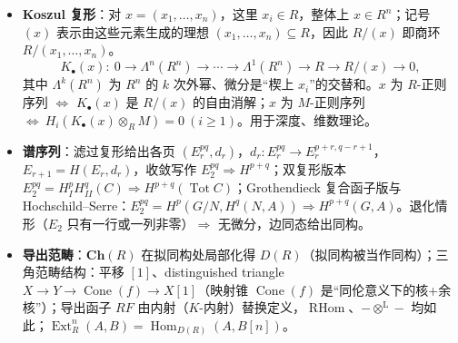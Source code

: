 \documentclass[12pt,a4paper]{ctexart}
\DeclareMathOperator{\Hom}{Hom}
\DeclareMathOperator{\Ext}{Ext}
\DeclareMathOperator{\Tot}{Tot}
\begin{document}
\begin{itemize}
  \item \textbf{Koszul 复形}：对 $x=(x_1,\dots,x_n)$，这里
  $x_i\in R$，整体上 $x\in R^n$；记号
  $(x)$ 表示由这些元素生成的理想
  $(x_1,\dots,x_n)\subseteq R$，因此 $R/(x)$ 即商环
  $R/(x_1,\dots,x_n)$。
  \[
    K_\bullet(x):\ 0\longrightarrow\Lambda^n(R^n)\longrightarrow\cdots\longrightarrow\Lambda^1(R^n)\longrightarrow R\longrightarrow R/(x)\longrightarrow0,
  \]
  其中 $\Lambda^k(R^n)$ 为 $R^n$ 的 $k$ 次外幂、微分是“楔上 $x_i$”的交替和。$x$ 为 $R$-正则序列 $\Longleftrightarrow$ $K_\bullet(x)$ 是 $R/(x)$ 的自由消解；$x$ 为 $M$-正则序列 $\Longleftrightarrow\ H_i(K_\bullet(x)\otimes_RM)=0\ (i\ge1)$。用于深度、维数理论。
  \item \textbf{谱序列}：滤过复形给出各页 $(E_r^{pq},d_r)$，$d_r\colon E_r^{pq}\to E_r^{p+r,q-r+1}$，$E_{r+1}=H(E_r,d_r)$，收敛写作 $E_2^{pq}\Rightarrow H^{p+q}$；双复形版本 $E_2^{pq}=H^p_IH^q_{II}(C)\Rightarrow H^{p+q}(\Tot C)$；Grothendieck 复合函子版与 Hochschild--Serre：$E_2^{pq}=H^p(G/N,H^q(N,A))\Rightarrow H^{p+q}(G,A)$。退化情形（$E_2$ 只有一行或一列非零）$\Rightarrow$ 无微分，边同态给出同构。
  \item \textbf{导出范畴}：$\mathbf{Ch}(R)$ 在拟同构处局部化得 $D(R)$（拟同构被当作同构）；三角范畴结构：平移 $[1]$、distinguished triangle $X\to Y\to\operatorname{Cone}(f)\to X[1]$（映射锥 $\operatorname{Cone}(f)$ 是“同伦意义下的核+余核”）；导出函子 $RF$ 由内射（$K$-内射）替换定义，$\operatorname{RHom}$、$-\otimes^{\mathrm L}-$ 均如此；$\Ext_R^n(A,B)=\Hom_{D(R)}(A,B[n])$。
\end{itemize}
\end{document}
